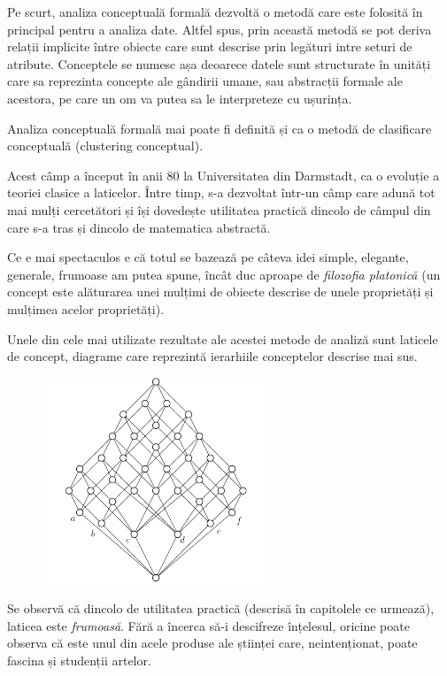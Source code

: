 \documentclass[12pt, a4paper, twoside, romanian]{teza-upb}
\begin{document}
Pe scurt, analiza conceptuală formală dezvoltă o metodă care este folosită în principal pentru a analiza date. Altfel spus, prin această metodă se pot deriva relații implicite între obiecte care sunt descrise prin legături intre seturi de atribute. Conceptele se numesc așa deoarece datele sunt structurate în unități care sa reprezinta concepte ale gândirii umane, sau abstracții formale ale acestora, pe care un om va putea sa le interpreteze cu ușurința.

Analiza conceptuală formală mai poate fi definită și ca o metodă de clasificare conceptuală (clustering conceptual).

  Acest câmp a început în anii 80 la Universitatea din Darmstadt, ca o evoluție a teoriei clasice a laticelor. Între timp, s-a dezvoltat într-un câmp care adună tot mai mulți cercetători și își dovedește utilitatea practică dincolo de câmpul din care s-a tras și dincolo de matematica abstractă.

  Ce e mai spectaculos e că totul se bazează pe câteva idei simple, elegante, generale, frumoase am putea spune, încât duc aproape de \textit{filozofia platonică} (un concept este alăturarea unei mulțimi de obiecte descrise de unele proprietăți și mulțimea acelor proprietăți).

  Unele din cele mai utilizate rezultate ale acestei metode de analiză sunt laticele de concept, diagrame care reprezintă ierarhiile conceptelor descrise mai sus. 
  
  \begin{figure}[h!]
    \centering
    \includegraphics[width=0.6\textwidth, natwidth=944,natheight=864]{complete_lattice.png}
  \end{figure}
  Se observă că dincolo de utilitatea practică (descrisă în capitolele ce urmează), laticea este \textit{frumoasă}. Fără a încerca să-i descifreze înțelesul, oricine poate observa că este unul din acele produse ale științei care, neintenționat, poate fascina și studenții artelor.
\end{document}
